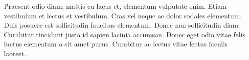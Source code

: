 Praesent odio diam, mattis eu lacus et, elementum vulputate enim. Etiam vestibulum et lectus et vestibulum. Cras vel neque ac dolor sodales elementum. Duis posuere est sollicitudin faucibus elementum. Donec non sollicitudin diam. Curabitur tincidunt justo id sapien lacinia accumsan. Donec eget odio vitae felis luctus elementum a sit amet purus. Curabitur ac lectus vitae lectus iaculis laoreet. \par